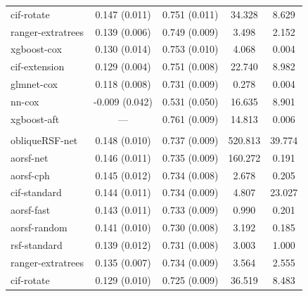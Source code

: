 \documentclass{article}\usepackage[]{graphicx}\usepackage[]{xcolor}
\newenvironment{knitrout}{}{} %
\begin{document}
\begin{knitrout}
\begin{longtable}[t]{lcccc}
\hspace{1em}cif-rotate & 0.147 (0.011) & 0.751 (0.011) & 34.328 & 8.629\\
\hspace{1em}ranger-extratrees & 0.139 (0.006) & 0.749 (0.009) & 3.498 & 2.152\\
\hspace{1em}xgboost-cox & 0.130 (0.014) & 0.753 (0.010) & 4.068 & 0.004\\
\hspace{1em}cif-extension & 0.129 (0.004) & 0.751 (0.008) & 22.740 & 8.982\\
\hspace{1em}glmnet-cox & 0.118 (0.008) & 0.731 (0.009) & 0.278 & 0.004\\
\hspace{1em}nn-cox & -0.009 (0.042) & 0.531 (0.050) & 16.635 & 8.901\\
\hspace{1em}xgboost-aft & --- & 0.761 (0.009) & 14.813 & 0.006\\
\addlinespace[0.3em]
\multicolumn{5}{l}{\textit{\textbf{Rotterdam tumor bank; recurrence, n = 2982, p = 11}}}\\
\hline
\hspace{1em}obliqueRSF-net & 0.148 (0.010) & 0.737 (0.009) & 520.813 & 39.774\\
\hspace{1em}aorsf-net & 0.146 (0.011) & 0.735 (0.009) & 160.272 & 0.191\\
\hspace{1em}aorsf-cph & 0.145 (0.012) & 0.734 (0.008) & 2.678 & 0.205\\
\hspace{1em}cif-standard & 0.144 (0.011) & 0.734 (0.009) & 4.807 & 23.027\\
\hspace{1em}aorsf-fast & 0.143 (0.011) & 0.733 (0.009) & 0.990 & 0.201\\
\hspace{1em}aorsf-random & 0.141 (0.010) & 0.730 (0.008) & 3.192 & 0.185\\
\hspace{1em}rsf-standard & 0.139 (0.012) & 0.731 (0.008) & 3.003 & 1.000\\
\hspace{1em}ranger-extratrees & 0.135 (0.007) & 0.734 (0.009) & 3.564 & 2.555\\
\hspace{1em}cif-rotate & 0.129 (0.010) & 0.725 (0.009) & 36.519 & 8.483\\

\end{longtable}
\end{knitrout}
\end{document}
